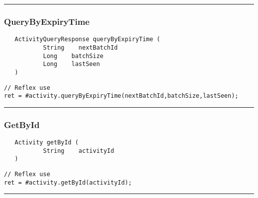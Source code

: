\rule{15cm}{2pt}
\subsubsection{QueryByExpiryTime}
\label{Api:QueryByExpiryTime}
\begin{verbatim}
   ActivityQueryResponse queryByExpiryTime (
           String    nextBatchId
           Long    batchSize
           Long    lastSeen
   )
\end{verbatim}
\begin{lstlisting}[language=reflex]
// Reflex use
ret = #activity.queryByExpiryTime(nextBatchId,batchSize,lastSeen);
\end{lstlisting}



\rule{15cm}{2pt}
\subsubsection{GetById}
\label{Api:GetById}
\begin{verbatim}
   Activity getById (
           String    activityId
   )
\end{verbatim}
\begin{lstlisting}[language=reflex]
// Reflex use
ret = #activity.getById(activityId);
\end{lstlisting}



\rule{15cm}{2pt}
